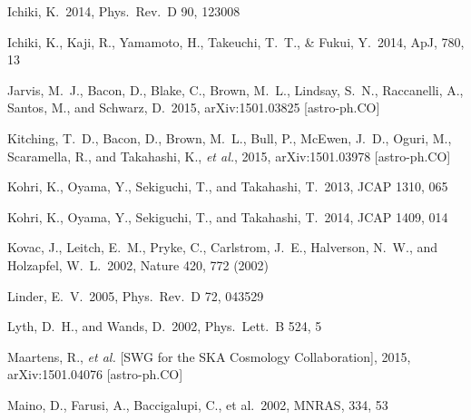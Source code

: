 \begin{thebibliography}{99}
\begin{multicols}{2}
{ 
  Ichiki, K.\ 2014,
  Phys.\ Rev.\ D 90, 123008

 Ichiki, K., Kaji, R., 
Yamamoto, H., Takeuchi, T.~T., \& Fukui, Y.\ 2014, ApJ, 780, 13 


  Jarvis, M.~J., Bacon, D., Blake, C., Brown, M.~L., Lindsay, S.~N., Raccanelli, A., Santos, M., and Schwarz, D.\ 2015,
  arXiv:1501.03825 [astro-ph.CO]


  Kitching, T.~D., Bacon, D., Brown, M.~L., Bull, P., McEwen, J.~D., Oguri, M., Scaramella, R., and Takahashi, K., {\it et al.}, 2015,
  arXiv:1501.03978 [astro-ph.CO]

  Kohri, K., Oyama, Y., Sekiguchi, T., and Takahashi, T.\ 2013,
  JCAP 1310, 065

  Kohri, K., Oyama, Y., Sekiguchi, T., and Takahashi, T.\ 2014,
  JCAP 1409, 014

  Kovac, J., Leitch, E.~M., Pryke, C., Carlstrom, J.~E., Halverson, N.~W., and Holzapfel, W.~L.\ 2002,
  Nature 420, 772 (2002)


  Linder, E.~V.\ 2005,
  Phys.\ Rev.\ D 72, 043529

  Lyth, D.~H., and Wands, D.\ 2002,
  Phys.\ Lett.\ B 524, 5


  Maartens, R., {\it et al.}  [SWG for the SKA Cosmology Collaboration], 2015,
  arXiv:1501.04076 [astro-ph.CO]

 Maino, D., Farusi, A., 
Baccigalupi, C., et al.\ 2002, MNRAS, 334, 53 

}
\end{multicols}
\end{thebibliography}
